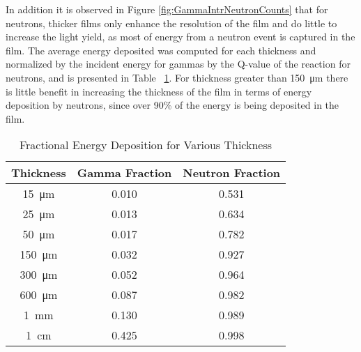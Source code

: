 \documentclass[draftcls,onecolumn]{IEEEtran}
\begin{document}
In addition it is observed in Figure \ref{fig:GammaIntrNeutronCounts} that for neutrons, thicker films only enhance the resolution of the film and do little to increase the light yield, as most of energy from a neutron event is captured in the film.
The average energy deposited was computed for each thickness and normalized by the incident energy for gammas by the Q-value of the reaction for neutrons, and is presented in Table ~\ref{tab:FractionEDep}.
For thickness greater than \SI{150}{\um} there is little benefit in increasing the thickness of the film in terms of energy deposition by neutrons, since over 90\% of the energy is being deposited in the film.
\begin{table}[ht]
    \caption{Fractional Energy Deposition for Various Thickness}
	\centering
	\begin{tabular}{c | c c}
	Thickness & Gamma Fraction & Neutron Fraction \\
	\hline
	\hline
	\SI{15}{\um} & 0.010 & 0.531 \\
	\SI{25}{\um} & 0.013 & 0.634 \\
	\SI{50}{\um} & 0.017 & 0.782 \\
	\SI{150}{\um} & 0.032 & 0.927 \\
	\SI{300}{\um} & 0.052 & 0.964 \\
	\SI{600}{\um} & 0.087 & 0.982 \\
	\SI{1}{\mm} & 0.130 & 0.989 \\
	\SI{1}{\cm} & 0.425 & 0.998 \\
	\end{tabular}
  \label{tab:FractionEDep}
\end{table}
\end{document}
